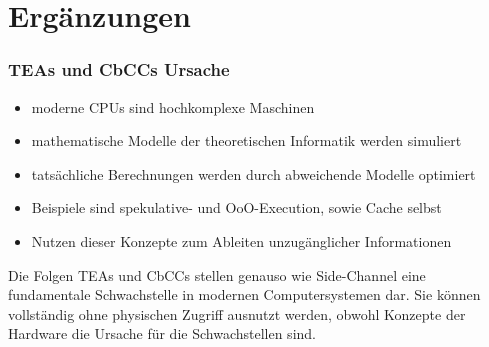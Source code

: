 
\section{Ergänzungen}

\begin{frame}
    \frametitle{\acp{TEA} und \acp{CbCC} Ursache}

    \begin{itemize}
        \item moderne \acp{CPU} sind hochkomplexe Maschinen
        \item mathematische Modelle der theoretischen Informatik werden simuliert
        \item tatsächliche Berechnungen werden durch abweichende Modelle optimiert
        \item Beispiele sind spekulative- und \ac{OoO}-Execution, sowie Cache selbst
        \item Nutzen dieser Konzepte zum Ableiten unzugänglicher Informationen
    \end{itemize}

    \pause

    \begin{block}{Die Folgen}
        \acp{TEA} und \acp{CbCC} stellen genauso wie Side-Channel
        eine fundamentale Schwachstelle in modernen Computersystemen
        dar. Sie können vollständig ohne physischen Zugriff ausnutzt
        werden, obwohl Konzepte der Hardware die Ursache für die
        Schwachstellen sind.
    \end{block}

\end{frame}

